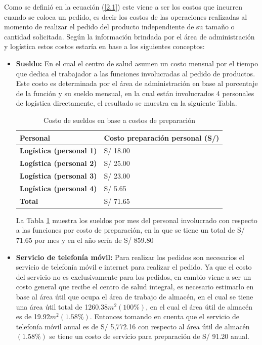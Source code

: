 Como se definió en la ecuación (\ref{2.1}) este viene a ser los costos que incurren cuando se coloca un pedido, es decir los costos de las operaciones realizadas al momento de realizar el pedido del producto independiente de su tamaño o cantidad solicitada. Según la información brindada por el área de administración y logística estos costos estaría en base a los siguientes conceptos:

\begin{itemize}
\item \textbf{Sueldo:} En el cual el centro de salud asumen un costo mensual por el tiempo que dedica el trabajador a las funciones involucradas al pedido de productos. Este costo es determinada por el área de administración en base al porcentaje de la función y su sueldo mensual, en la cual están involucrados 4 personales de logística directamente, el resultado se muestra en la siguiente Tabla.

\begin{table}[H]
    \caption{Costo de sueldos en base a costos de preparación}
    \begin{tabular}{p{5cm} p{8cm}} %
        \hline
        \textbf{Personal} & \textbf{Costo preparación personal (S/)} \\
        \hline
        \textbf{Logística (personal 1)} & S/ 18.00 \\
        \textbf{Logística (personal 2)} & S/ 25.00 \\
        \textbf{Logística (personal 3)} & S/ 23.00 \\
        \textbf{Logística (personal 4)} & S/ 5.65 \\
        \hline
        \textbf{Total} & S/ 71.65
    \end{tabular}
    \label{table:Personal_costo_preparacion}
\end{table}

La Tabla \ref{table:Personal_costo_preparacion} muestra los sueldos por mes del personal involucrado con respecto a las funciones por costo de preparación, en la que se tiene un total de S/ 71.65 por mes y en el año sería de S/ 859.80

\item \textbf{Servicio de telefonía móvil:} Para realizar los pedidos son necesarios el servicio de telefonía móvil e internet para realizar el pedido. Ya que el costo del servicio no es exclusivamente para los pedidos, en cambio viene a ser un costo general que recibe el centro de salud integral, es necesario estimarlo en base al área útil que ocupa el área de trabajo de almacén, en el cual se tiene una área útil total de 1260.38$m^2(100\%)$, en el cual el área útil de almacén es de 19.92$m^2(1.58\%)$. Entonces tomando en cuenta que el servicio de telefonía móvil anual es de S/ 5,772.16 con respecto al área útil de almacén $(1.58\%)$ se tiene un costo de servicio para preparación de S/ 91.20 anual.

\end{itemize}

